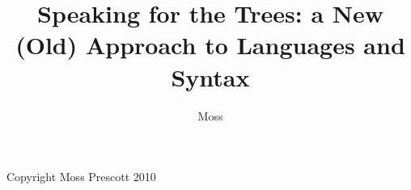\documentclass[defaultstyle,11pt]{thesis}
\title{Speaking for the Trees: a New (Old) Approach to Languages and Syntax}
\author{Moss}{Prescott}
\begin{document}
{
\OnePageChapter
Copyright Moss Prescott 2010
}








%




\nocite{*}		%




\end{document}
